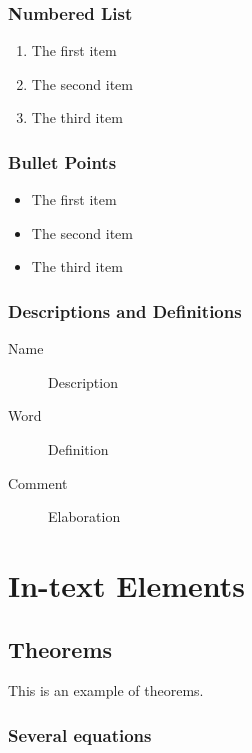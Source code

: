 \documentclass[11pt,fleqn]{book} %
\begin{document}
\subsection{Numbered List}

\begin{enumerate}
\item The first item
\item The second item
\item The third item
\end{enumerate}

\subsection{Bullet Points}

\begin{itemize}
\item The first item
\item The second item
\item The third item
\end{itemize}

\subsection{Descriptions and Definitions}

\begin{description}
\item[Name] Description
\item[Word] Definition
\item[Comment] Elaboration
\end{description}


\chapter{In-text Elements}

\section{Theorems}

This is an example of theorems.

\subsection{Several equations}
\end{document}
